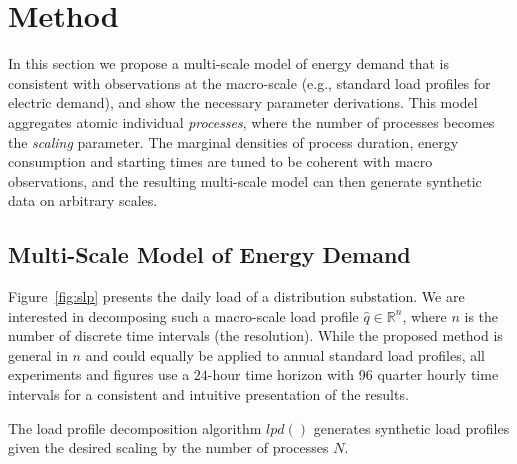 \documentclass[conference]{IEEEtran}
\begin{document}
\section{Method}
\label{sec:Method}

In this section we propose a multi-scale model of energy demand that is consistent with observations at the macro-scale (e.g., standard load profiles for electric demand), and show the necessary parameter derivations. This model aggregates atomic individual \emph{processes}, where the number of processes becomes the \emph{scaling} parameter. The marginal densities of process duration, energy consumption and starting times are tuned to be coherent with macro observations, and the resulting multi-scale model can then generate synthetic data on arbitrary scales.



\subsection{Multi-Scale Model of Energy Demand}\label{sec:LoadProfilesDecomposition}

Figure~\ref{fig:slp} presents the daily load of a distribution substation. We are interested in decomposing such a macro-scale load profile $\hat{q} \in \mathbb{R}^n$, where $n$ is the number of discrete time intervals (the resolution). While the proposed method is general in $n$ and could equally be applied to annual standard load profiles, all experiments and figures use a $24$-hour time horizon with 96 quarter hourly time intervals for a consistent and intuitive presentation of the results.

The load profile decomposition algorithm $lpd()$ generates synthetic load profiles given the desired scaling by the number of processes $N$. 
\end{document}

